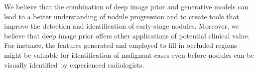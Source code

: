 \documentclass[runningheads]{llncs}
\begin{document}
We believe that the combination of deep image prior and generative models can lead to a better understanding of nodule progression and to create tools that improve the detection and identification of early-stage nodules. Moreover, we believe that deep image prior offers other applications of potential clinical value. For instance, the features generated and employed to fill in occluded regions might be valuable for identification of malignant cases even before nodules can be visually identified by experienced radiologists.
%
%
%
% 
% 
%

\printbibliography
\end{document}
